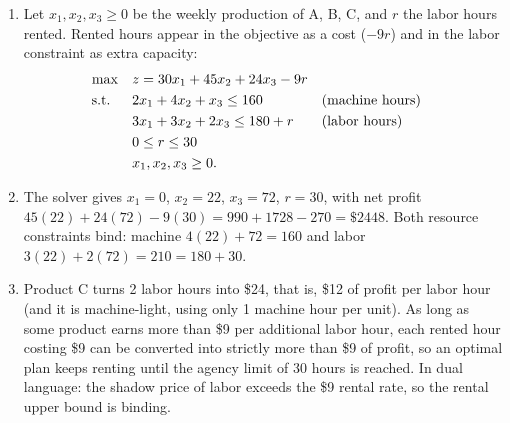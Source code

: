 
\begin{enumerate}
\item Let $x_1, x_2, x_3 \geq 0$ be the weekly production of A, B, C, and $r$ the labor hours rented. Rented hours appear in the objective as a cost ($-9r$) and in the labor constraint as extra capacity:
\begin{align*}
\max \quad & z = 30x_1 + 45x_2 + 24x_3 - 9r\\
\text{s.t.}\;\; \quad & 2x_1 + 4x_2 + x_3 \leq 160 && \text{(machine hours)}\\
& 3x_1 + 3x_2 + 2x_3 \leq 180 + r && \text{(labor hours)}\\
& 0 \leq r \leq 30\\
& x_1, x_2, x_3 \geq 0.
\end{align*}
\item The solver gives $x_1 = 0$, $x_2 = 22$, $x_3 = 72$, $r = 30$, with net profit $45(22) + 24(72) - 9(30) = 990 + 1728 - 270 = \$2448$. Both resource constraints bind: machine $4(22) + 72 = 160$ and labor $3(22) + 2(72) = 210 = 180 + 30$.
\item Product C turns 2 labor hours into \$24, that is, \$12 of profit per labor hour (and it is machine-light, using only 1 machine hour per unit). As long as some product earns more than \$9 per additional labor hour, each rented hour costing \$9 can be converted into strictly more than \$9 of profit, so an optimal plan keeps renting until the agency limit of 30 hours is reached. In dual language: the shadow price of labor exceeds the \$9 rental rate, so the rental upper bound is binding.
\end{enumerate}
